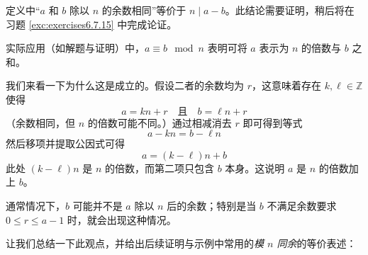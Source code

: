 \begin{remark}
    定义中``$a$ 和 $b$ 除以 $n$ 的余数相同''等价于 $n \mid a - b$。此结论需要证明，稍后将在习题 \ref{exc:exercises6.7.15} 中完成论证。
\end{remark}

\begin{remark}
    实际应用（如解题与证明）中，$a \equiv b \mod{n}$ 表明可将 $a$ 表示为 $n$ 的倍数与 $b$ 之和。
\end{remark}

我们来看一下为什么这是成立的。假设二者的余数均为 $r$，这意味着存在 $k, \ell \in \mathbb{Z}$ 使得
\[a = kn + r \quad\text{且}\quad b = \ell n + r\]
（余数相同，但 $n$ 的倍数可能不同。）通过相减消去 $r$ 即可得到等式
\[a - kn = b - \ell n\]
然后移项并提取公因式可得
\[a = (k - \ell)n + b\]
此处 $(k - \ell)n$ 是 $n$ 的倍数，而第二项只包含 $b$ 本身。这说明 $a$ 是 $n$ 的倍数加上 $b$。

通常情况下，$b$ 可能并不是 $a$ 除以 $n$ 后的余数；特别是当 $b$ 不满足余数要求 $0 \le r \le a - 1$ 时，就会出现这种情况。

让我们总结一下此观点，并给出后续证明与示例中常用的\emph{模 $n$ 同余}的等价表述：

\setlength{\fboxrule}{2pt}
\begin{center}
\end{center}

